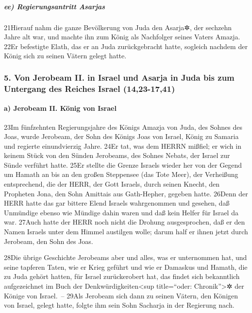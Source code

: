 \hypertarget{ee-regierungsantritt-asarjas}{%
\subparagraph{ee) Regierungsantritt
Asarjas}\label{ee-regierungsantritt-asarjas}}

21Hierauf nahm die ganze Bevölkerung von Juda den Asarja✲, der sechzehn
Jahre alt war, und machte ihn zum König als Nachfolger seines Vaters
Amazja. 22Er befestigte Elath, das er an Juda zurückgebracht hatte,
sogleich nachdem der König sich zu seinen Vätern gelegt hatte.

\hypertarget{von-jerobeam-ii.-in-israel-und-asarja-in-juda-bis-zum-untergang-des-reiches-israel-1423-1741}{%
\subsubsection{5. Von Jerobeam II. in Israel und Asarja in Juda bis zum
Untergang des Reiches Israel
(14,23-17,41)}\label{von-jerobeam-ii.-in-israel-und-asarja-in-juda-bis-zum-untergang-des-reiches-israel-1423-1741}}

\hypertarget{a-jerobeam-ii.-kuxf6nig-von-israel}{%
\paragraph{a) Jerobeam II. König von
Israel}\label{a-jerobeam-ii.-kuxf6nig-von-israel}}

23Im fünfzehnten Regierungsjahre des Königs Amazja von Juda, des Sohnes
des Joas, wurde Jerobeam, der Sohn des Königs Joas von Israel, König zu
Samaria und regierte einundvierzig Jahre. 24Er tat, was dem HERRN
mißfiel; er wich in keinem Stück von den Sünden Jerobeams, des Sohnes
Nebats, der Israel zur Sünde verführt hatte. 25Er stellte die Grenze
Israels wieder her von der Gegend um Hamath an bis an den großen
Steppensee (das Tote Meer), der Verheißung entsprechend, die der HERR,
der Gott Israels, durch seinen Knecht, den Propheten Jona, den Sohn
Amittais aus Gath-Hepher, gegeben hatte. 26Denn der HERR hatte das gar
bittere Elend Israels wahrgenommen und gesehen, daß Unmündige ebenso wie
Mündige dahin waren und daß kein Helfer für Israel da war. 27Auch hatte
der HERR noch nicht die Drohung ausgesprochen, daß er den Namen Israels
unter dem Himmel austilgen wolle; darum half er ihnen jetzt durch
Jerobeam, den Sohn des Joas.

28Die übrige Geschichte Jerobeams aber und alles, was er unternommen
hat, und seine tapferen Taten, wie er Krieg geführt und wie er Damaskus
und Hamath, die zu Juda gehört hatten, für Israel zurückerobert hat, das
findet sich bekanntlich aufgezeichnet im Buch der
Denkwürdigkeiten\textless sup title=``oder: Chronik''\textgreater✲ der
Könige von Israel.~-- 29Als Jerobeam sich dann zu seinen Vätern, den
Königen von Israel, gelegt hatte, folgte ihm sein Sohn Sacharja in der
Regierung nach.


